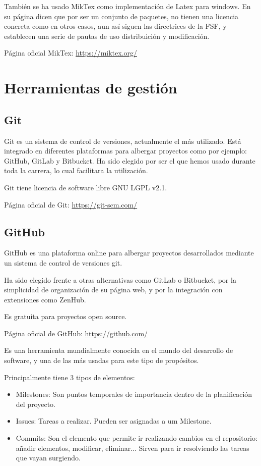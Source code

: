 También se ha usado MikTex como implementación de Latex para windows. En su página dicen que por ser un conjunto de paquetes, no tienen una licencia concreta como en otros casos, aun así siguen las directrices de la FSF\cite{fsf}, y establecen una serie de pautas de uso distribuición y modificación.

Página oficial MikTex: \url{https://miktex.org/}

\section{Herramientas de gestión}

\subsection{Git}
Git es un sistema de control de versiones, actualmente el más utilizado. Está integrado en diferentes plataformas para albergar proyectos como por ejemplo: GitHub, GitLab y Bitbucket.
Ha sido elegido por ser el que hemos usado durante toda la carrera, lo cual facilitara la utilización.

Git tiene licencia de software libre GNU LGPL v2.1.

Página oficial de Git: \url{https://git-scm.com/}

\subsection{GitHub}
GitHub es una plataforma online para albergar proyectos desarrollados mediante un sistema de control de versiones git. 

Ha sido elegido frente a otras alternativas como GitLab o Bitbucket, por la simplicidad de organización de su página web, y por la integración con extensiones como ZenHub.

Es gratuita para proyectos open source.

Página oficial de GitHub: \url{https://github.com/}


Es una herramienta mundialmente conocida en el mundo del desarrollo de software, y una de las más usadas para este tipo de propósitos.

Principalmente tiene 3 tipos de elementos:
\begin{itemize}
	\item Milestones: Son puntos temporales de importancia dentro de la planificación del proyecto.
	\item Issues: Tareas a realizar. Pueden ser asignadas a um Milestone. 
 	\item Commits: Son el elemento que permite ir realizando cambios en el repositorio: añadir elementos, modificar, eliminar... Sirven para ir resolviendo las tareas que vayan surgiendo.
\end{itemize}

